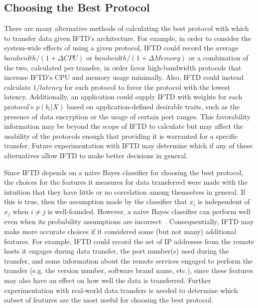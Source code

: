 \subsection{Choosing the Best Protocol}

There are many alternative methods of calculating the best protocol with which to transfer data given IFTD's architecture.  For example, in order to consider the system-wide effects of using a given protocol, IFTD could record the average $bandwidth / (1 + \Delta{CPU})$ or $bandwidth / (1 + \Delta{Memory})$ or a combination of the two, calculated per transfer, in order favor high-bandwidth protocols that increase IFTD's CPU and memory usage minimally.  Also, IFTD could instead calculate $1 / latency$ for each protocol to favor the protocol with the lowest latency.  Additionally, an application could supply IFTD with weights for each protocol's $p(b_i|X)$ based on application-defined desirable traits, such as the presence of data encryption or the usage of certain port ranges.  This favorability information may be beyond the scope of IFTD to calculate but may affect the usability of the protocols enough that providing it is warranted for a specific transfer.  Future experimentation with IFTD may determine which if any of these alternatives allow IFTD to make better decisions in general.

Since IFTD depends on a naive Bayes classifier for choosing the best protocol, the choices for the features it measures for data transferred were made with the intuition that they have little or no correlation among themselves in general.  If this is true, then the assumption made by the classifier that $x_i$ is independent of $x_j$ when $i \neq j$ is well-founded.  However, a naive Bayes classifier can perform well even when its probability assumptions are incorrect~\cite{naivebayes}.  Consequentially, IFTD may make more accurate choices if it considered some (but not many) additional features.  For example, IFTD could record the set of IP addresses from the remote hosts it engages during data transfer, the port number(s) used during the transfer, and some information about the remote services engaged to perform the transfer (e.g. the version number, software brand name, etc.), since these features may also have an effect on how well the data is transferred.  Further experimentation with real-world data transfers is needed to determine which subset of features are the most useful for choosing the best protocol.
